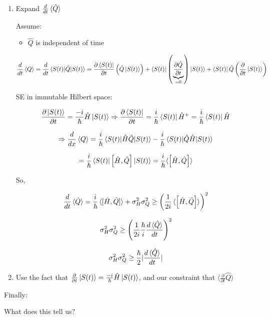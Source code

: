 \documentclass{article}
\begin{document}
\begin{enumerate}
    \item Expand $\frac{d}{dt} \braket{\hat{Q}}$
    
    Assume:
    
    \begin{itemize}
        \item $\hat{Q}$ is independent of time
    \end{itemize}
    
    $$\frac{d}{dt} \braket{Q} = \frac{d}{dt} \braket{S(t)|\hat{Q}|S(t)} = \frac{\partial \bra{S(t)}}{\partial t} \left( \hat{Q} \ket{S(t)} \right) + \braket{S(t)| \left( \underbrace{\frac{\partial \hat{Q}}{\partial t}}_{=0} \right)|S(t)} + \bra{S(t)} \hat{Q} \left( \frac{\partial}{\partial t} \ket{S(t)} \right)$$
    
    SE in immutable Hilbert space:
    
    $$\frac{\partial \ket{S(t)}}{\partial t} = \frac{-i}{\hbar} \hat{H} \ket{S(t)} \Rightarrow \frac{\partial \bra{S(t)}}{\partial t} = \frac{i}{\hbar} \bra{S(t)} \hat{H}^+ = \frac{i}{\hbar} \bra{S(t)} \hat{H}$$
    
    $$\Rightarrow \frac{d}{dx} \braket{Q} = \frac{i}{\hbar} \braket{S(t)|\hat{H} \hat{Q} | S(t)} - \frac{i}{\hbar} \braket{S(t)|\hat{Q} \hat{H}|S(t)}$$
    
    $$= \frac{i}{\hbar} \braket{S(t)| \left[ \hat{H}, \hat{Q} \right] |S(t)} = \frac{i}{\hbar } \langle \left[ \hat{H}, \hat{Q} \right] \rangle$$
    
    So, 
    
    $$\frac{d}{dt} \braket{\hat{Q}} = \frac{i}{\hbar} \braket{[\hat{H}, \hat{Q}]} + \sigma_H^2 \sigma_Q^2 \geq \left( \frac{1}{2i} \braket{\left[ \hat{H}, \hat{Q} \right]} \right)^2$$
    
    $$\sigma_H^2 \sigma_Q^2 \geq \left( \frac{1}{2i} \frac{\hbar}{i} \frac{d \braket{\hat{Q}}}{dt} \right)^2$$
    
    $$\sigma_H^2 \sigma_Q^2 \geq \frac{\hbar}{2} |  \frac{d \braket{\hat{Q}}}{dt}|$$
    
    
    \item Use the fact that $\frac{\partial}{\partial t} \ket{S(t)} = \frac{-i}{\hbar} \hat{H} \ket{S(t)}$, and our constraint that $\langle \frac{\partial}{\partial t} \hat{Q} \rangle$
\end{enumerate}

Finally:


What does this tell us?
\end{document}
